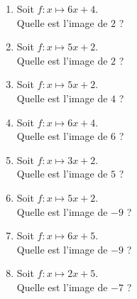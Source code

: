 \begin{multicols}{2}
\begin{enumerate}[itemsep=1.5em]
	\item \begin{minipage}[t]{\linewidth} Soit $f: x \longmapsto
            6x+4$. \\ Quelle est l'image de $2$ ?\\ \dtf \end{minipage}
	\item \begin{minipage}[t]{\linewidth} Soit $f: x \longmapsto 5x+2$. \\ Quelle est l'image de $2$ ?\\ \dtf \end{minipage}
	\item \begin{minipage}[t]{\linewidth} Soit $f: x \longmapsto 5x+2$. \\ Quelle est l'image de $4$ ?\\ \dtf \end{minipage}
	\item \begin{minipage}[t]{\linewidth} Soit $f: x \longmapsto 6x+4$. \\ Quelle est l'image de $6$ ?\\ \dtf \end{minipage}
	\item \begin{minipage}[t]{\linewidth} Soit $f: x \longmapsto 3x+2$. \\ Quelle est l'image de $5$ ?\\ \dtf \end{minipage}
	\item \begin{minipage}[t]{\linewidth} Soit $f: x \longmapsto 5x+2$. \\ Quelle est l'image de $-9$ ?\\ \dtf \end{minipage}
	\item \begin{minipage}[t]{\linewidth} Soit $f: x \longmapsto 6x+5$. \\ Quelle est l'image de $-9$ ?\\ \dtf \end{minipage}
	\item \begin{minipage}[t]{\linewidth} Soit $f: x \longmapsto 2x+5$. \\ Quelle est l'image de $-7$ ?\\ \dtf \end{minipage}

\end{enumerate}
\end{multicols}
